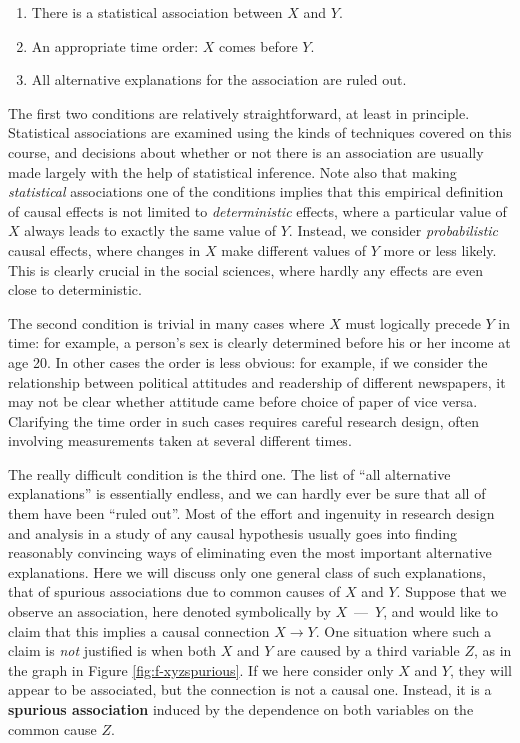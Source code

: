 \documentclass[11pt,a4paper,openany]{book}
\begin{document}
\begin{enumerate}
\def\labelenumi{\arabic{enumi}.}
\item
  There is a statistical association between \(X\) and \(Y\).
\item
  An appropriate time order: \(X\) comes before \(Y\).
\item
  All alternative explanations for the association are ruled out.
\end{enumerate}

The first two conditions are relatively straightforward, at least in
principle. Statistical associations are examined using the kinds of
techniques covered on this course, and decisions about whether or not
there is an association are usually made largely with the help of
statistical inference. Note also that making \emph{statistical}
associations one of the conditions implies that this empirical
definition of causal effects is not limited to \emph{deterministic}
effects, where a particular value of \(X\) always leads to exactly the
same value of \(Y\). Instead, we consider \emph{probabilistic} causal
effects, where changes in \(X\) make different values of \(Y\) more or
less likely. This is clearly crucial in the social sciences, where
hardly any effects are even close to deterministic.

The second condition is trivial in many cases where \(X\) must logically
precede \(Y\) in time: for example, a person's sex is clearly determined
before his or her income at age 20. In other cases the order is less
obvious: for example, if we consider the relationship between political
attitudes and readership of different newspapers, it may not be clear
whether attitude came before choice of paper of vice versa. Clarifying
the time order in such cases requires careful research design, often
involving measurements taken at several different times.

The really difficult condition is the third one. The list of ``all
alternative explanations'' is essentially endless, and we can hardly
ever be sure that all of them have been ``ruled out''. Most of the
effort and ingenuity in research design and analysis in a study of any
causal hypothesis usually goes into finding reasonably convincing ways
of eliminating even the most important alternative explanations. Here we
will discuss only one general class of such explanations, that of
spurious associations due to common causes of \(X\) and \(Y\). Suppose
that we observe an association, here denoted symbolically by
\(X\)~---~\(Y\), and would like to claim that this implies a causal
connection \(X\longrightarrow Y\). One situation where such a claim is
\emph{not} justified is when both \(X\) and \(Y\) are caused by a third
variable \(Z\), as in the graph in Figure \ref{fig:f-xyzspurious}. If we
here consider only \(X\) and \(Y\), they will appear to be associated,
but the connection is not a causal one. Instead, it is a
\textbf{spurious association} induced by the dependence on both
variables on the common cause \(Z\).
\end{document}
